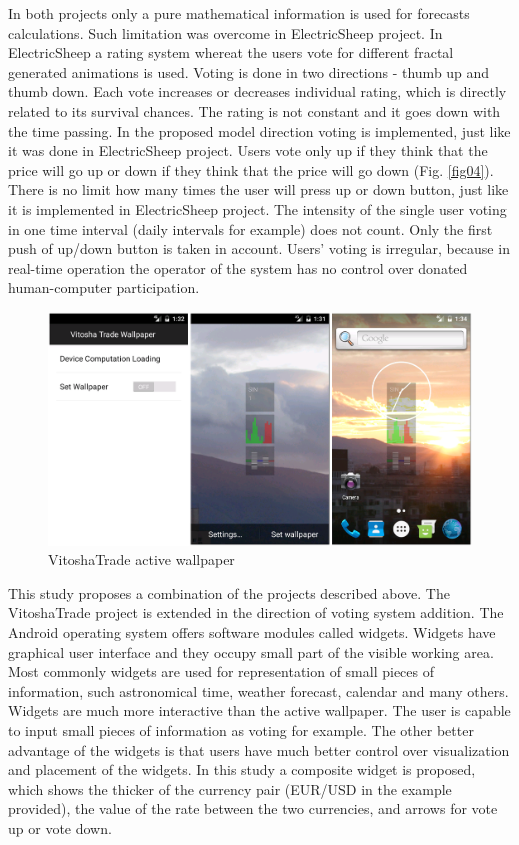 \documentclass[runningheads]{llncs}
\begin{document}
In both projects only a pure mathematical information is used for forecasts calculations. Such limitation was overcome in ElectricSheep \cite{draves01} project. In ElectricSheep a rating system whereat the users vote for different fractal generated animations is used. Voting is done in two directions - thumb up and thumb down. Each vote increases or decreases individual rating, which is directly related to its survival chances. The rating is not constant and it goes down with the time passing. In the proposed model direction voting is implemented, just like it was done in ElectricSheep project. Users vote only up if they think that the price will go up or down if they think that the price will go down (Fig. \ref{fig04}). There is no limit how many times the user will press up or down button, just like it is implemented in ElectricSheep project. The intensity of the single user voting in one time interval (daily intervals for example) does not count. Only the first push of up/down button is taken in account. Users' voting is irregular, because in real-time operation the operator of the system has no control over donated human-computer participation. 

\begin{figure}
\includegraphics[width=1.0\textwidth]{fig02.png}
\centering
\caption{VitoshaTrade active wallpaper} \label{fig02}
\end{figure}
\FloatBarrier

This study proposes a combination of the projects described above. The VitoshaTrade \cite{balabanov01} project is extended in the direction of voting system addition. The Android operating system offers software modules called widgets. Widgets have graphical user interface and they occupy small part of the visible working area. Most commonly widgets are used for representation of small pieces of information, such astronomical time, weather forecast, calendar and many others. Widgets are much more interactive than the active wallpaper. The user is capable to input small pieces of information as voting for example. The other better advantage of the widgets is that users have much better control over visualization and placement of the widgets. In this study a composite widget is proposed, which shows the thicker of the currency pair (EUR/USD in the example provided), the value of the rate between the two currencies, and arrows for vote up or vote down. 
\end{document}
